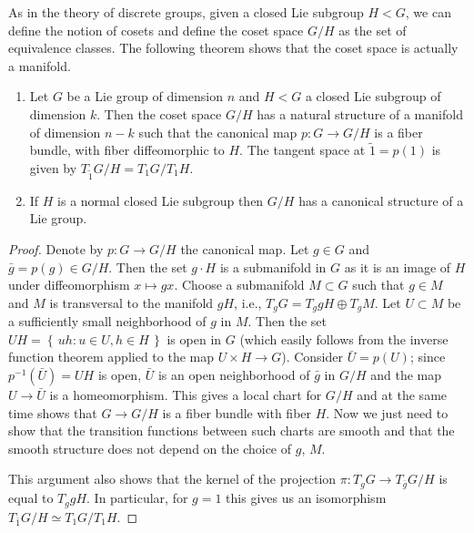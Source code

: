 As in the theory of discrete groups, given a closed Lie subgroup $H<G$, we
can define the notion of cosets and define the coset space $G/H$ as the set
of equivalence classes. The following theorem shows that the coset space is
actually a manifold.
\begin{theorem}
  \hfill
  \begin{enumerate}[label=\textnormal{(\arabic*)}]
  \item Let $G$ be a Lie group of dimension $n$ and $H<G$ a closed Lie
    subgroup of dimension $k$. Then the coset space $G/H$ has a natural
    structure of a manifold of dimension $n-k$ such that the canonical map
    $p\colon G\to G/H$ is a fiber bundle, with fiber diffeomorphic to
    $H$. The tangent space at $\tilde 1=p(1)$ is given by
    $T_{\tilde 1}G/H=T_1G/T_1H$.
  \item If $H$ is a normal closed Lie subgroup then $G/H$ has a canonical
    structure of a Lie group.
  \end{enumerate}
\end{theorem}
\begin{proof}
  Denote by $p\colon G\to G/H$ the canonical map. Let $g\in G$ and
  $\bar g=p(g)\in G/H$. Then the set $g\cdot H$ is a submanifold in $G$ as
  it is an image of $H$ under diffeomorphism $x\mapsto gx$. Choose a
  submanifold $M\subset G$ such that $g\in M$ and $M$ is transversal to the
  manifold $gH$, i.e., $T_gG=T_ggH\oplus T_gM$. Let $U\subset M$ be a
  sufficiently small neighborhood of $g$ in $M$. Then the set
  $UH=\left\{\,uh:u\in U,h\in H\,\right\}$ is open in $G$ (which easily
  follows from the inverse function theorem applied to the map
  $U\times H\to G$). Consider $\bar U=p(U)$; since $p^{-1}(\bar U)=UH$ is
  open, $\bar U$ is an open neighborhood of $\bar g$ in $G/H$ and the map
  $U\to \bar U$ is a homeomorphism. This gives a local chart for $G/H$ and
  at the same time shows that $G\to G/H$ is a fiber bundle with fiber
  $H$. Now we just need to show that the transition functions between such
  charts are smooth and that the smooth structure does not depend on the
  choice of $g$, $M$.

  This argument also shows that the kernel of the projection
  $\pi\colon T_gG\to T_{\bar g}G/H$ is equal to $T_ggH$. In particular, for
  $g=1$ this gives us an isomorphism $T_{\bar 1}G/H\simeq T_1G/T_1H$.
\end{proof}

